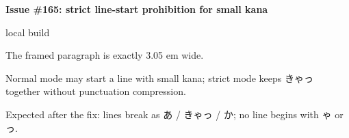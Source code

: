 \documentclass{article}
\providecommand\BuildLabel{local build}
\begin{document}
{\Large\bfseries Issue \#165: strict line-start prohibition for small kana}\par
{\small \BuildLabel}\par\bigskip

{\large The framed paragraph is exactly 3.05 em wide.}\par
{\large Normal mode may start a line with small kana; strict mode keeps
\textnormal{きゃっ} together without punctuation compression.}\par\bigskip

\begin{center}
  {\fontsize{38}{48}\selectfont
   }
\end{center}

{\large Expected after the fix: lines break as \textnormal{あ / きゃっ / か};
no line begins with \textnormal{ゃ} or \textnormal{っ}.}
\end{document}

